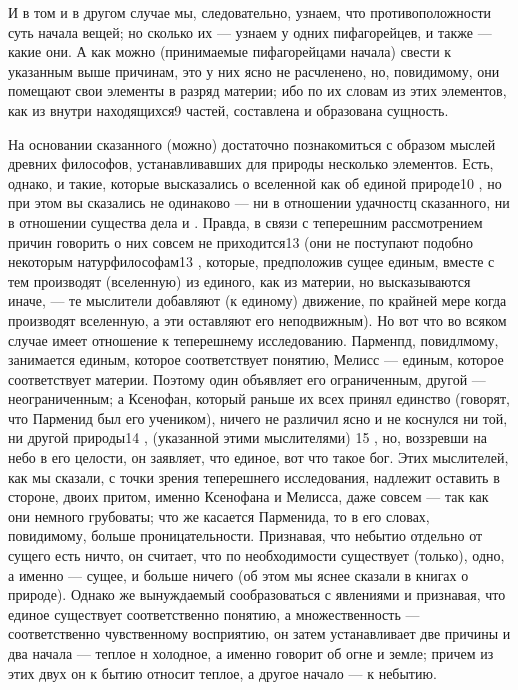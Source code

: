 \documentclass{article}
\begin{document}
{И в том и в другом случае мы, следовательно, узнаем, что противоположности суть начала вещей; но сколько их --- узнаем у одних пифагорейцев, и также --- какие они. А как можно (принимаемые пифагорейцами начала) свести к указанным выше причинам, это у них
\footnotemark[5]
ясно не расчленено, но, повидимому, они помещают свои элементы в разряд материи; ибо по их словам из этих элементов, как из внутри находящихся9  частей, составлена и образована сущность.

На основании сказанного (можно) достаточно познакомиться с образом мыслей древних философов, устанавливавших для природы несколько элементов. Есть, однако, и такие, которые высказались о вселенной как об единой природе10 , но при этом вы сказались не одинаково --- ни в отношении удачностц сказанного, ни в отношении существа дела  и . Правда, в связи с теперешним рассмотрением причин говорить о них  совсем не приходится13  (они не поступают подобно некоторым натурфилософам13 , которые, предположив сущее единым, вместе с тем производят (вселенную) из единого, как из материи, но высказываются иначе, --- те мыслители добавляют (к единому) движение, по крайней мере когда производят вселенную, а эти оставляют его неподвижным). Но вот что во всяком случае имеет отношение к теперешнему исследованию. Парменпд, повидлмому, занимается единым, которое соответствует понятию,
\footnotemark[6]
Мелисс --- единым, которое соответствует материи. Поэтому один объявляет его ограниченным, другой --- неограниченным; а Ксенофан, который раньше их всех принял единство (говорят, что Парменид был его учеником), ничего не различил ясно и не коснулся ни той, ни другой природы14 , (указанной этими мыслителями)  15 , но, воззревши на небо в его целости, он заявляет, что единое, вот что такое бог. Этих мыслителей, как мы сказали, с точки зрения теперешнего исследования, надлежит оставить в стороне, двоих притом, именно Ксенофана и Мелисса, даже совсем --- так как они немного грубоваты; что же касается Парменида, то в его словах, повидимому, больше проницательности. Признавая, что небытио отдельно от сущего есть ничто, он считает, что по необходимости существует (только), одно, а именно --- сущее, и больше ничего (об этом мы яснее сказали в книгах о природе).
\footnotemark[7]
Однако же вынуждаемый сообразоваться с явлениями и признавая, что единое существует соответственно понятию, а множественность --- соответственно чувственному восприятию, он затем устанавливает две причины и два начала --- теплое н холодное, а именно говорит об огне и земле; причем из этих двух он к бытию относит теплое, а другое начало --- к небытию.

}
\end{document}
